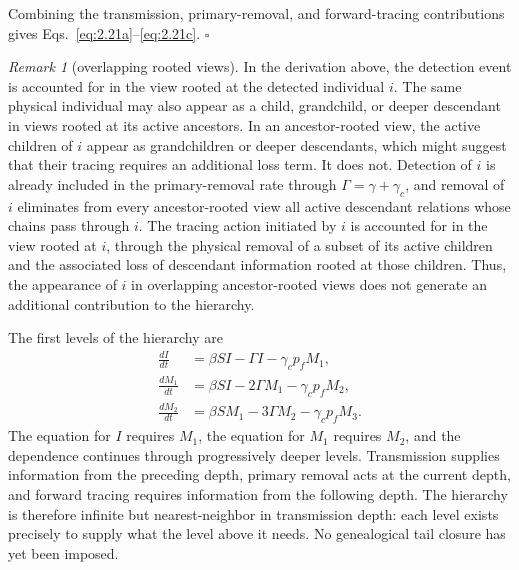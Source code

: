 \documentclass[review,12pt]{elsarticle}
\numberwithin{equation}{section}
\theoremstyle{remark}
\newtheorem{remark}{Remark}
\begin{document}
Combining the transmission, primary-removal, and forward-tracing contributions gives Eqs.~\eqref{eq:2.21a}--\eqref{eq:2.21c}. \hfill$\square$

\begin{remark}[overlapping rooted views]
In the derivation above, the detection event is accounted for in the view rooted at the detected individual $i$. The same physical individual may also appear as a child, grandchild, or deeper descendant in views rooted at its active ancestors. In an ancestor-rooted view, the active children of $i$ appear as grandchildren or deeper descendants, which might suggest that their tracing requires an additional loss term. It does not. Detection of $i$ is already included in the primary-removal rate through $\Gamma=\gamma+\gamma_c$, and removal of $i$ eliminates from every ancestor-rooted view all active descendant relations whose chains pass through $i$. The tracing action initiated by $i$ is accounted for in the view rooted at $i$, through the physical removal of a subset of its active children and the associated loss of descendant information rooted at those children. Thus, the appearance of $i$ in overlapping ancestor-rooted views does not generate an additional contribution to the hierarchy.
\end{remark}

The first levels of the hierarchy are
\begin{align}
\frac{dI}{dt} &= \beta S I - \Gamma I - \gamma_c p_f M_1, \label{eq:2.27a}\\
\frac{dM_1}{dt} &= \beta S I - 2\Gamma M_1 - \gamma_c p_f M_2, \label{eq:2.27b}\\
\frac{dM_2}{dt} &= \beta S M_1 - 3\Gamma M_2 - \gamma_c p_f M_3. \label{eq:2.27c}
\end{align}
The equation for $I$ requires $M_1$, the equation for $M_1$ requires $M_2$, and the dependence continues through progressively deeper levels. Transmission supplies information from the preceding depth, primary removal acts at the current depth, and forward tracing requires information from the following depth. The hierarchy is therefore infinite but nearest-neighbor in transmission depth: each level exists precisely to supply what the level above it needs. No genealogical tail closure has yet been imposed.
\end{document}
